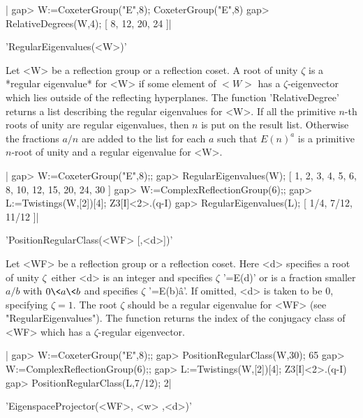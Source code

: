 |    gap> W:=CoxeterGroup("E",8);
    CoxeterGroup("E",8)
    gap> RelativeDegrees(W,4);
    [ 8, 12, 20, 24 ]|


'RegularEigenvalues(<W>)'

Let  <W>  be  a  reflection  group  or  a reflection coset. A root of unity
$\zeta$  is a *regular eigenvalue*  for <W> if some  element of $<W>$ has a
$\zeta$-eigenvector  which lies outside of  the reflecting hyperplanes. The
function 'RelativeDegree' returns a list describing the regular eigenvalues
for   <W>.  If  all  the  primitive  $n$-th  roots  of  unity  are  regular
eigenvalues,  then $n$ is  put on the  result list. Otherwise the fractions
$a/n$  are added to the list for each $a$ such that $E(n)^a$ is a primitive
$n$-root of unity and a regular eigenvalue for <W>.

|    gap> W:=CoxeterGroup("E",8);;
    gap> RegularEigenvalues(W);
    [ 1, 2, 3, 4, 5, 6, 8, 10, 12, 15, 20, 24, 30 ]
    gap> W:=ComplexReflectionGroup(6);;
    gap> L:=Twistings(W,[2])[4];
    Z3[I]<2>.(q-I)
    gap> RegularEigenvalues(L);
    [ 1/4, 7/12, 11/12 ]|


'PositionRegularClass(<WF> [,<d>])'

Let  <WF> be a reflection group or a reflection coset. Here <d> specifies a
root  of unity  $\zeta$\:\ either  <d> is  an integer and specifies $\zeta$
'=E(d)' or is a fraction smaller $a/b$ with $0\<a\<b$ and specifies $\zeta$
'=E(b)\^a'.  If omitted, <d> is taken  to be $0$, specifying $\zeta=1$. The
root $\zeta$ should be a regular eigenvalue for <WF> (see
"RegularEigenvalues").  The  function  returns  the  index of the conjugacy
class of <WF> which has a $\zeta$-regular eigenvector.

|    gap>  W:=CoxeterGroup("E",8);;
    gap> PositionRegularClass(W,30);
    65
    gap> W:=ComplexReflectionGroup(6);;
    gap> L:=Twistings(W,[2])[4];
    Z3[I]<2>.(q-I)
    gap> PositionRegularClass(L,7/12);
    2|


'EigenspaceProjector(<WF>, <w> ,<d>)'

